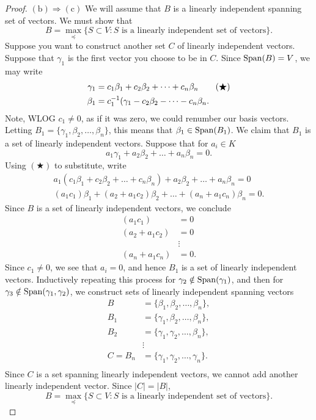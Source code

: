 \documentclass{ximera}
\begin{document}
\begin{theorem}
\begin{proof}
    

    $(\mathrm b)\Rightarrow(\mathrm c)$ We will assume that $B$ is a
    linearly independent spanning set of vectors. We must show that
    \[
    B = \max_{\preceq}\{S\subset V:\text{$S$ is a linearly independent set of vectors}\}.
    \]
    Suppose you want to construct another set $C$ of linearly
    independent vectors. Suppose that $\gamma_1$ is the first vector
    you choose to be in $C$. Since $\operatorname{Span}(B) = V$, we may write
    \begin{align}
      \gamma_1 &= c_1\beta_1 + c_2\beta_2 + \dots + c_n\beta_n \tag{$\bigstar$}\\
      \beta_1 &= c_1^{-1}(\gamma_1 -  c_2\beta_2 - \dots - c_n\beta_n.\notag
    \end{align}
    Note, WLOG $c_1 \ne 0$, as if it was zero, we could renumber our
    basis vectors.  Letting $B_1 = \{\gamma_1, \beta_2,\dots,
    \beta_n\}$, this means that $\beta_1\in \operatorname{Span}(B_1)$. We claim that
    $B_1$ is a set of linearly independent vectors. Suppose that for
    $a_i\in K$
    \[
    a_1 \gamma_1 + a_2 \beta_2 + \dots + a_n \beta_n = 0.
    \]
    Using $(\bigstar)$ to substitute, write
    \begin{align*}
      a_1(c_1\beta_1 + c_2\beta_2 + \dots + c_n\beta_n) + a_2 \beta_2 + \dots + a_n \beta_n = 0\\
      (a_1c_1) \beta_1 + (a_2+a_1c_2)\beta_2 + \dots + (a_n+a_1c_n)\beta_n = 0.
    \end{align*}
    Since $B$ is a set of linearly independent vectors, we conclude
    \begin{align*}
      (a_1c_1) &=0\\
      (a_2+a_1c_2) &=0\\
      &\vdots \\      
      (a_n+a_1c_n) &=0.
    \end{align*}
    Since $c_1\ne 0$, we see that $a_i = 0$, and hence $B_1$ is a set
    of linearly independent vectors. Inductively repeating this
    process for $\gamma_2\notin \operatorname{Span}(\gamma_1)$, and then for
    $\gamma_3 \notin \operatorname{Span}(\gamma_1,\gamma_2)$, we construct sets of
    linearly independent spanning vectors
    \begin{align*}
      B &= \{\beta_1,\beta_2,\dots,\beta_n\},\\
      B_1 &= \{\gamma_1,\beta_2,\dots,\beta_n\},\\
      B_2 &= \{\gamma_1,\gamma_2,\dots,\beta_n\},\\
      &\vdots \\
      C = B_n &= \{\gamma_1,\gamma_2,\dots,\gamma_n\}.\\
    \end{align*}
    Since $C$ is a set spanning linearly independent vectors, we
    cannot add another linearly independent vector. Since $|C| = |B|$,
    \[
    B = \max_{\preceq}\{S\subset V:\text{$S$ is a linearly independent set of vectors}\}.
    \]
    

\end{proof}
\end{theorem}
\end{document}

